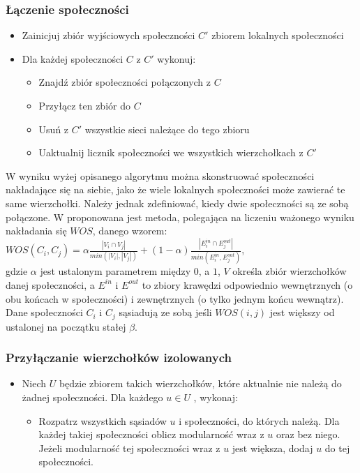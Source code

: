 \documentclass{article}
\begin{document}
\subsubsection{Łączenie społeczności}
\begin{itemize}
\item Zainicjuj zbiór wyjściowych społeczności $C'$ zbiorem lokalnych społeczności
\item Dla każdej społeczności $C$ z $C'$ wykonuj:
\begin{itemize}
\item Znajdź zbiór społeczności połączonych z $C$
\item Przyłącz ten zbiór do $C$
\item Usuń z $C'$ wszystkie sieci należące do tego zbioru
\item Uaktualnij licznik społeczności we wszystkich wierzchołkach z $C'$
\end{itemize}
\end{itemize}

W wyniku wyżej opisanego algorytmu można skonstruować społeczności nakładające się na siebie, jako że wiele lokalnych społeczności może zawierać te same wierzchołki. Należy jednak zdefiniować, kiedy dwie społeczności są ze sobą połączone. W \cite{bt-paper1} proponowana jest metoda, polegająca na liczeniu ważonego wyniku nakładania się $WOS$, danego wzorem:\\
$WOS(C_i,C_j) = \alpha\frac{|V_i \cap V_j|}{min(|V_i|,|V_j|)} + (1-\alpha)\frac{|E^{in}_i \cap E^{out}_j|}{min(E^{in}_i,E^{out}_j)}$, \\gdzie $\alpha$ jest ustalonym parametrem między $0$, a $1$, $V$ określa zbiór wierzchołków danej społeczności, a $E^{in}$ i $E^{out}$ to zbiory krawędzi odpowiednio wewnętrznych (o obu końcach w społeczności) i zewnętrznych (o tylko jednym końcu wewnątrz). Dane społeczności $C_i$ i $C_j$ sąsiadują ze sobą jeśli $WOS(i,j)$ jest większy od ustalonej na początku stałej $\beta$.
\subsubsection{Przyłączanie wierzchołków izolowanych}
\begin{itemize}
\item Niech $U$ będzie zbiorem takich wierzchołków, które aktualnie nie należą do żadnej społeczności. Dla każdego $u \in U$ , wykonaj:
\begin{itemize}
\item Rozpatrz wszystkich sąsiadów $u$ i społeczności, do których należą. Dla każdej takiej społeczności oblicz modularność wraz z $u$ oraz bez niego. Jeżeli modularność tej społeczności wraz z $u$ jest większa, dodaj $u$ do tej społeczności.
\end{itemize}
\end{itemize}
\end{document}
